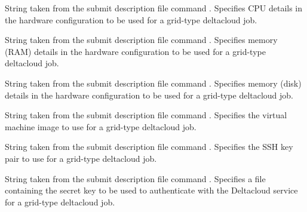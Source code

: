 \begin{description}
\item[\AdAttr{DeltacloudHardwareProfileCpu}:] 
String taken from the submit description file command
. Specifies CPU
details in the hardware configuration to be used for a grid-type
deltacloud job.

\item[\AdAttr{DeltacloudHardwareProfileMemory}:] 
String taken from the submit description file command
. Specifies memory (RAM)
details in the hardware configuration to be used for a grid-type
deltacloud job.

\item[\AdAttr{DeltacloudHardwareProfileStorage}:] 
String taken from the submit description file command
. Specifies memory (disk)
details in the hardware configuration to be used for a grid-type
deltacloud job.

\item[\AdAttr{DeltacloudImageId}:] 
String taken from the submit description file command
.
Specifies the virtual machine image to use for a grid-type deltacloud
job.

\item[\AdAttr{DeltacloudKeyname}:] 
String taken from the submit description file command
.
Specifies the SSH key pair to use for a grid-type deltacloud job.

\item[\AdAttr{DeltacloudPasswordFile}:] 
String taken from the submit description file command
.
Specifies a file containing the secret key to be used to authenticate
with the Deltacloud service for a grid-type deltacloud job.


\end{description}
